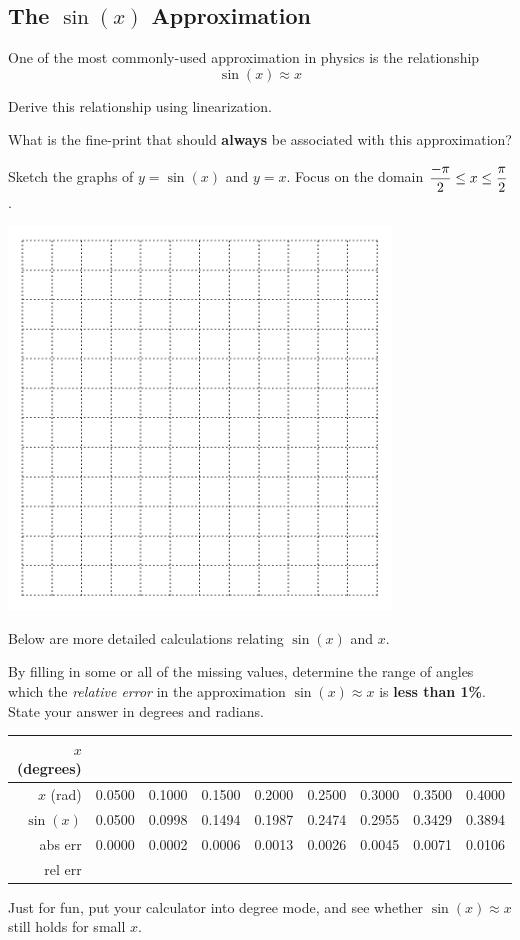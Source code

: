 \newpage
{}
\subsection*{The $\sin(x)$ Approximation}
One of the most commonly-used approximation in physics
is the relationship
\[ \sin(x) \approx x
\]
\begin{problem}
 Derive this relationship using linearization. \vfill
\end{problem}

 What is the fine-print that should {\bf always} be associated with this approximation? \vspace{1in}

\newpage

Sketch the graphs of $y = \sin(x) $ and $y = x$. Focus on the domain $\displaystyle \frac{-\pi}{2} \le x \le  \frac{\pi}{2}$.

\includegraphics[width=4in]{graphics/empty_graph_square_12}


\newpage  Below are more detailed calculations relating
$\sin(x)$ and $x$.  

By filling in some or all of the missing values, determine the range
of angles which the {\em relative error} in the approximation $\sin(x)
\approx x$ is {\bf less than 1\%}. State your answer in degrees and radians.
\vspace{0.2in}

{\LARGE
	\begin{tabular}{||r||c|c|c|c|c|c|c|c||} \hline
	$x$ (degrees) &  & & & & & & & \\ \hline
	$x$ (rad) & 0.0500&          0.1000&          0.1500  & 0.2000  &0.2500 & 0.3000 & 0.3500 & 0.4000\\ \hline
	$\sin(x)$ & 0.0500 &0.0998 &0.1494 &0.1987 &0.2474 &0.2955 &0.3429 &0.3894 \\ \hline
	abs err & 0.0000 &0.0002 &0.0006 &0.0013 &0.0026 &0.0045 &0.0071 &0.0106 \\ \hline
	rel err &  & & & & & & & \\ \hline
	\end{tabular}
}
	

\newpage
 Just for fun, put your calculator into degree mode, and see whether $\sin(x) \approx x$ still holds for small $x$.
	

\newpage
  

